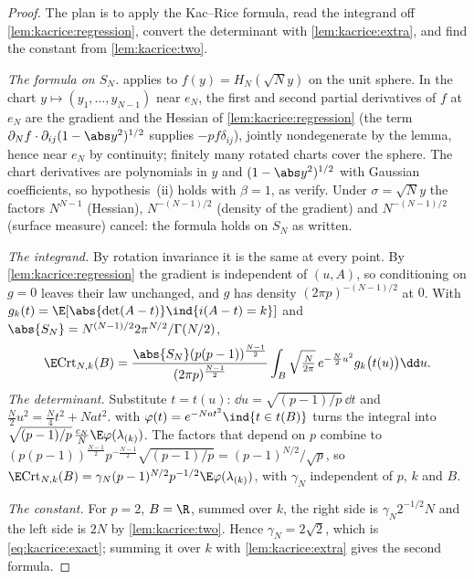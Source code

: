 \begin{refsection}
\begin{proof}
The plan is to apply the Kac--Rice formula, read the integrand off \cref{lem:kacrice:regression}, convert the determinant with \cref{lem:kacrice:extra}, and find the constant from \cref{lem:kacrice:two}.

\emph{The formula on $S_N$.}  applies to $f(y)=H_N(\sqrt Ny)$ on the unit sphere. In the chart $y\mapsto(y_1,\dots,y_{N-1})$ near $e_N$, the first and second partial derivatives of $f$ at $e_N$ are the gradient and the Hessian of \cref{lem:kacrice:regression} (the term $\partial_Nf\cdot\partial_{ij}(1-\abs y^2)^{1/2}$ supplies $-pf\delta_{ij}$), jointly nondegenerate by the lemma, hence near $e_N$ by continuity; finitely many rotated charts cover the sphere. The chart derivatives are polynomials in $y$ and $(1-\abs y^2)^{1/2}$ with Gaussian coefficients, so hypothesis~(ii) holds with $\beta=1$, as \textcite{AuffingerBenArousCerny2013} verify. Under $\sigma=\sqrt Ny$ the factors $N^{N-1}$ (Hessian), $N^{-(N-1)/2}$ (density of the gradient) and $N^{-(N-1)/2}$ (surface measure) cancel: the formula holds on $S_N$ as written.

\emph{The integrand.} By rotation invariance it is the same at every point. By \cref{lem:kacrice:regression} the gradient is independent of $(u,A)$, so conditioning on $g=0$ leaves their law unchanged, and $g$ has density $(2\pi p)^{-(N-1)/2}$ at $0$. With $g_k(t)=\E[\abs{\det(A-t)}\ind\{i(A-t)=k\}]$ and $\abs{S_N}=N^{(N-1)/2}2\pi^{N/2}/\Gamma(N/2)$,
\[
\E\kacriceCrt_{N,k}(B)=\frac{\abs{S_N}(p(p-1))^{\frac{N-1}2}}{(2\pi p)^{\frac{N-1}2}}\int_B\sqrt{\tfrac N{2\pi}}\,e^{-\frac N2u^2}g_k\bigl(t(u)\bigr)\dd u.
\]
\emph{The determinant.} Substitute $t=t(u)$: $\dd u=\sqrt{(p-1)/p}\,\dd t$ and $\frac N2u^2=\frac N4t^2+Nat^2$.  with $\varphi(t)=e^{-Nat^2}\ind\{t\in t(B)\}$ turns the integral into $\sqrt{(p-1)/p}\,\frac{c_N}N\E\varphi(\lambda_{(k)})$. The factors that depend on $p$ combine to $(p(p-1))^{\frac{N-1}2}p^{-\frac{N-1}2}\sqrt{(p-1)/p}=(p-1)^{N/2}/\sqrt p$, so $\E\kacriceCrt_{N,k}(B)=\gamma_N(p-1)^{N/2}p^{-1/2}\E\varphi(\lambda_{(k)})$, with $\gamma_N$ independent of $p$, $k$ and $B$.

\emph{The constant.} For $p=2$, $B=\R$, summed over $k$, the right side is $\gamma_N2^{-1/2}N$ and the left side is $2N$ by \cref{lem:kacrice:two}. Hence $\gamma_N=2\sqrt2$, which is \eqref{eq:kacrice:exact}; summing it over $k$ with \cref{lem:kacrice:extra} gives the second formula.
\end{proof}


\end{refsection}
